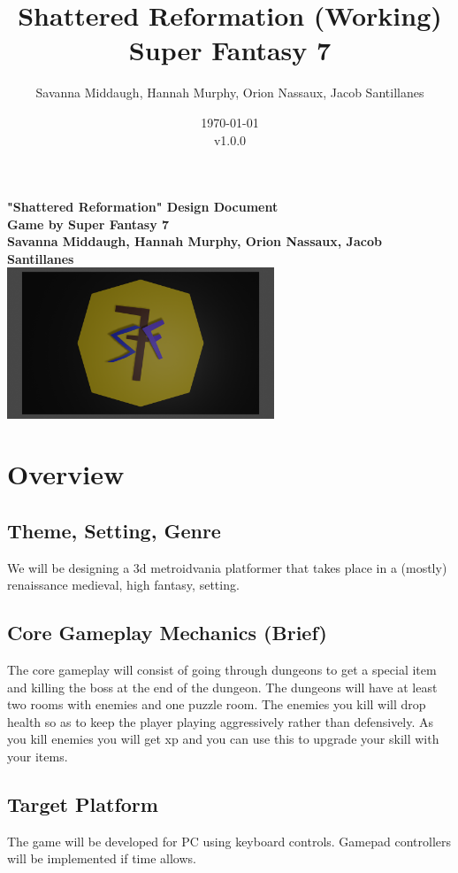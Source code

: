 \documentclass[titlepage]{article}
\title{Shattered Reformation (Working)\\Super Fantasy 7}
\author{Savanna Middaugh, Hannah Murphy, Orion Nassaux, Jacob Santillanes}
\date{\today\\v1.0.0}
\begin{document}
\begin{titlepage}
    \centering
    \vfill
    {\bfseries\Large
        "Shattered Reformation" Design Document\\
        Game by Super Fantasy 7\\
        \vskip2cm
        Savanna Middaugh, Hannah Murphy, Orion Nassaux, Jacob Santillanes\\
    }    
    \vfill
    \includegraphics[width=8cm]{./images/logo.png}
    \vfill
    \vfill
\end{titlepage}

\section{Overview}

\subsection*{Theme, Setting, Genre}
We will be designing a 3d metroidvania platformer that takes place in a (mostly)
 renaissance medieval, high fantasy, setting. 

\subsection*{Core Gameplay Mechanics (Brief)}
The core gameplay will consist of going through dungeons to get a special item 
and killing the boss at the end of the dungeon. The dungeons will have at least 
two rooms with enemies and one puzzle room. The enemies you kill will drop 
health so as to keep the player playing aggressively rather than defensively. As
 you kill enemies you will get xp and you can use this to upgrade your skill 
 with your items. 

\subsection*{Target Platform}
The game will be developed for PC using keyboard controls. Gamepad controllers 
will be implemented if time allows.
\end{document}
